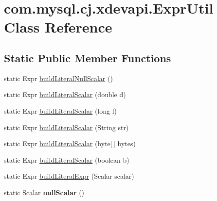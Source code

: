 \hypertarget{classcom_1_1mysql_1_1cj_1_1xdevapi_1_1_expr_util}{}\section{com.\+mysql.\+cj.\+xdevapi.\+Expr\+Util Class Reference}
\label{classcom_1_1mysql_1_1cj_1_1xdevapi_1_1_expr_util}
\subsection*{Static Public Member Functions}
\begin{DoxyCompactItemize}
\item 
static Expr \mbox{\hyperlink{classcom_1_1mysql_1_1cj_1_1xdevapi_1_1_expr_util_ac5c53b4aaa810519b4ccfccedbf4d951}{build\+Literal\+Null\+Scalar}} ()
\item 
static Expr \mbox{\hyperlink{classcom_1_1mysql_1_1cj_1_1xdevapi_1_1_expr_util_a9012d3fccfc27722989eaf4e2b0fe0e4}{build\+Literal\+Scalar}} (double d)
\item 
static Expr \mbox{\hyperlink{classcom_1_1mysql_1_1cj_1_1xdevapi_1_1_expr_util_a797efd3e01c40c0ea772edd2032ce024}{build\+Literal\+Scalar}} (long l)
\item 
static Expr \mbox{\hyperlink{classcom_1_1mysql_1_1cj_1_1xdevapi_1_1_expr_util_a7a1bbcacdc534348ba9d712d6b9a7bbf}{build\+Literal\+Scalar}} (String str)
\item 
static Expr \mbox{\hyperlink{classcom_1_1mysql_1_1cj_1_1xdevapi_1_1_expr_util_ad94de8c51a601e7c4415e2cc651b7187}{build\+Literal\+Scalar}} (byte\mbox{[}$\,$\mbox{]} bytes)
\item 
static Expr \mbox{\hyperlink{classcom_1_1mysql_1_1cj_1_1xdevapi_1_1_expr_util_a7dd1d131c79981f74e4f33b41e4df40f}{build\+Literal\+Scalar}} (boolean b)
\item 
static Expr \mbox{\hyperlink{classcom_1_1mysql_1_1cj_1_1xdevapi_1_1_expr_util_a2afeea823683209f07637ea40323715b}{build\+Literal\+Expr}} (Scalar scalar)
\item 
\mbox{\label{classcom_1_1mysql_1_1cj_1_1xdevapi_1_1_expr_util_a3fc7a40cc6955a58fc65f830f7c25631}} 
static Scalar {\bfseries null\+Scalar} ()
\item 
\mbox{\label{classcom_1_1mysql_1_1cj_1_1xdevapi_1_1_expr_util_a0a7d21dcfcb1aa6814466afea74ecd5b}} 

\end{DoxyCompactItemize}
